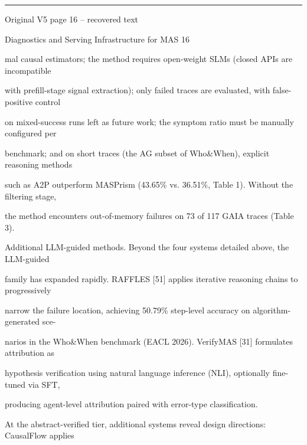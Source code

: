 \par\smallskip\noindent\rule{\textwidth}{0.4pt}\par{\sffamily\footnotesize Original V5 page 16 -- recovered text}\par\begin{flushleft}\footnotesize\ttfamily
\par\smallskip
\par\smallskip
\noindent Diagnostics and Serving Infrastructure for MAS 16\par
\par\smallskip
\par\smallskip
\par\smallskip
\noindent mal causal estimators; the method requires open-weight SLMs (closed APIs are incompatible\par
\noindent with prefill-stage signal extraction); only failed traces are evaluated, with false-positive control\par
\noindent on mixed-success runs left as future work; the symptom ratio must be manually configured per\par
\noindent benchmark; and on short traces (the AG subset of Who\&When), explicit reasoning methods\par
\noindent such as A2P outperform MASPrism (43.65\% vs. 36.51\%, Table 1). Without the filtering stage,\par
\noindent the method encounters out-of-memory failures on 73 of 117 GAIA traces (Table 3).\par
\par\smallskip
\noindent Additional LLM-guided methods. Beyond the four systems detailed above, the LLM-guided\par
\noindent family has expanded rapidly. RAFFLES [51] applies iterative reasoning chains to progressively\par
\noindent narrow the failure location, achieving 50.79\% step-level accuracy on algorithm-generated sce-\par
\noindent narios in the Who\&When benchmark (EACL 2026). VerifyMAS [31] formulates attribution as\par
\noindent hypothesis verification using natural language inference (NLI), optionally fine-tuned via SFT,\par
\noindent producing agent-level attribution paired with error-type classification.\par
\noindent  At the abstract-verified tier, additional systems reveal design directions: CausalFlow applies\par

\end{flushleft}
